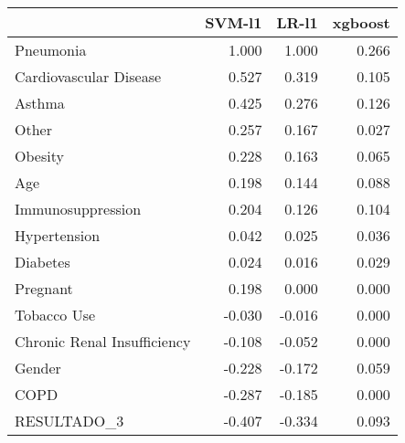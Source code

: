 \begin{tabular}{lrrr}
\toprule
{} &  SVM-l1 &  LR-l1 &  xgboost \\
\midrule
Pneumonia                   &   1.000 &  1.000 &    0.266 \\
Cardiovascular Disease      &   0.527 &  0.319 &    0.105 \\
Asthma                      &   0.425 &  0.276 &    0.126 \\
Other                       &   0.257 &  0.167 &    0.027 \\
Obesity                     &   0.228 &  0.163 &    0.065 \\
Age                         &   0.198 &  0.144 &    0.088 \\
Immunosuppression           &   0.204 &  0.126 &    0.104 \\
Hypertension                &   0.042 &  0.025 &    0.036 \\
Diabetes                    &   0.024 &  0.016 &    0.029 \\
Pregnant                    &   0.198 &  0.000 &    0.000 \\
Tobacco Use                 &  -0.030 & -0.016 &    0.000 \\
Chronic Renal Insufficiency &  -0.108 & -0.052 &    0.000 \\
Gender                      &  -0.228 & -0.172 &    0.059 \\
COPD                        &  -0.287 & -0.185 &    0.000 \\
RESULTADO\_3                 &  -0.407 & -0.334 &    0.093 \\
\bottomrule
\end{tabular}
